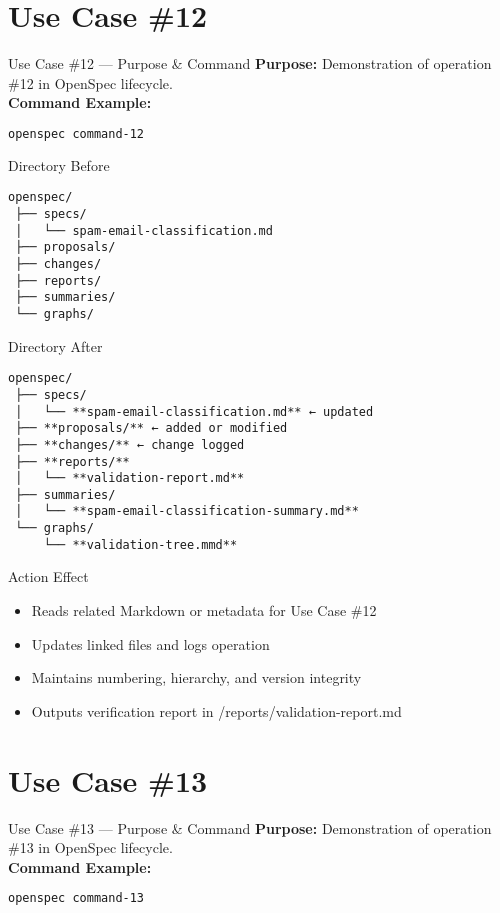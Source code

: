 \documentclass[aspectratio=169]{beamer}
\begin{document}
\section*{Use Case \#12}
\begin{frame}{Use Case \#12 --- Purpose \& Command}
\textbf{Purpose:} Demonstration of operation \#12 in OpenSpec lifecycle.\\[4pt]
\textbf{Command Example:}
\begin{lstlisting}[language=bash]
openspec command-12
\end{lstlisting}
\end{frame}

\begin{frame}{Directory Before}
\begin{lstlisting}
openspec/
 ├── specs/
 │   └── spam-email-classification.md
 ├── proposals/
 ├── changes/
 ├── reports/
 ├── summaries/
 └── graphs/
\end{lstlisting}
\end{frame}

\begin{frame}{Directory After}
\begin{lstlisting}
openspec/
 ├── specs/
 │   └── **spam-email-classification.md** ← updated
 ├── **proposals/** ← added or modified
 ├── **changes/** ← change logged
 ├── **reports/**
 │   └── **validation-report.md**
 ├── summaries/
 │   └── **spam-email-classification-summary.md**
 └── graphs/
     └── **validation-tree.mmd**
\end{lstlisting}
\end{frame}

\begin{frame}{Action Effect}
\begin{itemize}
  \item Reads related Markdown or metadata for Use Case \#12
  \item Updates linked files and logs operation
  \item Maintains numbering, hierarchy, and version integrity
  \item Outputs verification report in /reports/validation-report.md
\end{itemize}
\end{frame}

\section*{Use Case \#13}
\begin{frame}{Use Case \#13 --- Purpose \& Command}
\textbf{Purpose:} Demonstration of operation \#13 in OpenSpec lifecycle.\\[4pt]
\textbf{Command Example:}
\begin{lstlisting}[language=bash]
openspec command-13
\end{lstlisting}
\end{frame}
\end{document}
